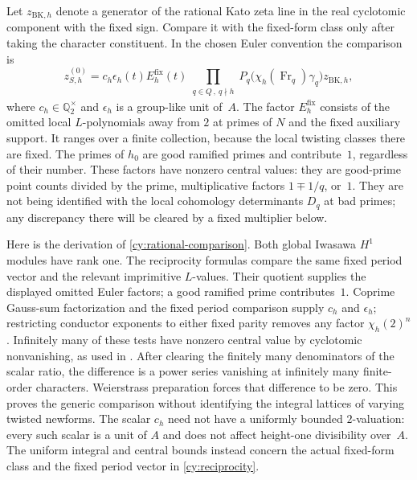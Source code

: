 Let $z_{\mathrm{BK},h}$ denote a generator of the rational Kato zeta
line in the real cyclotomic component with the fixed sign.  Compare it
with the fixed-form class only after taking the character constituent.
In the chosen Euler convention the comparison is
\begin{equation}\label{cy:rational-comparison}
 z_{S,h}^{(0)}
  =c_h\epsilon_h(t)E_h^{\mathrm{fix}}(t)
    \prod_{\substack{q\in Q\,,\ q\nmid h}}
       P_q\bigl(\chi_h(\operatorname{Fr}_q)\gamma_q\bigr)
       z_{\mathrm{BK},h},
\end{equation}
where $c_h\in\mathbb Q_2^\times$ and $\epsilon_h$ is a group-like
unit of~$A$.  The factor $E_h^{\mathrm{fix}}$ consists of the omitted
local $L$-polynomials away from $2$ at primes of $N$ and the fixed
auxiliary support.  It ranges over a finite collection, because the
local twisting classes there are fixed.  The primes of $h_0$ are good
ramified primes and contribute~$1$, regardless of their number.
These factors have nonzero central values: they are good-prime point
counts divided by the prime, multiplicative factors $1\mp1/q$, or~$1$.
They are not being identified with the local cohomology determinants
$D_q$ at bad primes; any discrepancy there will be cleared by a fixed
multiplier below.

Here is the derivation of \eqref{cy:rational-comparison}.  Both global
Iwasawa $H^1$ modules have rank one.  The reciprocity formulas
\cite[Theorems~6.6, 9.7, 12.5(1), and Lemma~13.10(2)]{Kato2004}
compare the same fixed period vector and the relevant imprimitive
$L$-values.  Their quotient supplies the displayed omitted Euler
factors; a good ramified prime contributes~$1$.  Coprime Gauss-sum
factorization and the fixed period comparison supply $c_h$ and
$\epsilon_h$; restricting conductor exponents to either fixed parity
removes any factor $\chi_h(2)^n$.  Infinitely many of these tests have
nonzero central value by cyclotomic nonvanishing, as used in
\cite[Theorem~13.5(2)]{Kato2004}.  After clearing the finitely many
denominators of the scalar ratio, the difference is a power series
vanishing at infinitely many finite-order characters.  Weierstrass
preparation forces that difference to be zero.  This proves the generic
comparison without identifying the integral lattices of varying
twisted newforms.  The scalar $c_h$ need not have a uniformly bounded
$2$-valuation: every such scalar is a unit of $A$ and does not affect
height-one divisibility over~$A$.  The uniform integral and central bounds instead concern
the actual fixed-form class and the fixed period vector in
\eqref{cy:reciprocity}.

